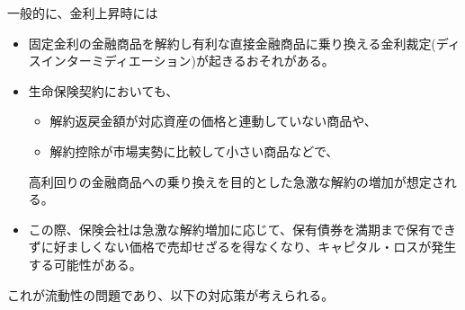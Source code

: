 \documentclass[report,gutter=10mm,fore-edge=10mm,uplatex,dvipdfmx]{jlreq}
\begin{document}
一般的に、金利上昇時には
\begin{itemize}
 \item 固定金利の金融商品を解約し有利な直接金融商品に乗り換える金利裁定(ディスインターミディエーション)が起きるおそれがある。
 \item 生命保険契約においても、
\begin{itemize}
 \item 解約返戻金額が対応資産の価格と連動していない商品や、
 \item 解約控除が市場実勢に比較して小さい商品などで、
\end{itemize}
高利回りの金融商品への乗り換えを目的とした急激な解約の増加が想定される。
 \item この際、保険会社は急激な解約増加に応じて、保有債券を満期まで保有できずに好ましくない価格で売却せざるを得なくなり、キャピタル・ロスが発生する可能性がある。
\end{itemize}
これが流動性の問題であり、以下の対応策が考えられる。
\end{document}

